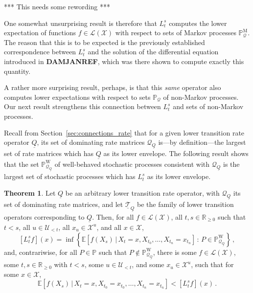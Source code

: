 \documentclass[10pt]{paper}
\theoremstyle{definition}
\newtheorem{theorem}{Theorem}
\newcommand{\reals}{\mathbb{R}}
\newcommand{\realsnonneg}{\reals_{\geq 0}}
\newcommand{\states}{\mathcal{X}}
\newcommand{\processes}{\mathbb{P}}
\newcommand{\mprocesses}{\processes^{\mathrm{M}}}
\newcommand{\wprocesses}{\processes^{\mathrm{W}}}
\newcommand{\gambles}{\mathcal{L}}
\newcommand{\gamblesX}{\gambles(\states)}
\newcommand{\rateset}{\mathcal{Q}}
\newcommand{\lrate}{\underline{Q}}
\begin{document}
*** This needs some rewording ***

One somewhat unsurprising result is therefore that $L_t^s$ computes the lower expectation of functions $f\in\gamblesX$ with respect to sets of Markov processes $\mprocesses_\rateset$. The reason that this is to be expected is the previously established correspondence between $L_t^s$ and the solution of the differential equation introduced in {\bf DAMJANREF}, which was there shown to compute exactly this quantity.

A rather more surprising result, perhaps, is that this \emph{same} operator also computes lower expectations with respect to sets $\processes_\rateset$ of non-Markov processes. Our next result strengthens this connection between $L_t^s$ and sets of non-Markov processes.

Recall from Section~\ref{sec:connections_rate} that for a given lower transition rate operator $\lrate$, its set of dominating rate matrices $\rateset_{\lrate}$ is---by definition---the largest set of rate matrices which has $\lrate$ as its lower envelope. The following result shows that the set $\wprocesses_{\rateset_{\lrate}}$ of well-behaved stochastic processes consistent with $\rateset_{\lrate}$ is the largest set of stochastic processes which has $L_t^s$ as its lower envelope.

\begin{theorem}\label{theo:dominating_rate_processes_max_set}
Let $\lrate$ be an arbitrary lower transition rate operator, with $\rateset_{\lrate}$ its set of dominating rate matrices, and let  $\underline{\mathcal{T}}_{\lrate}$ be the family of lower transition operators corresponding to $\lrate$. Then, for all $f\in\gamblesX$, all $t,s\in\realsnonneg$ such that $t<s$, all $u\in\mathcal{U}_{<t}$, all $x_u\in\states^u$, and all $x\in\states$,
\begin{equation*}
\left[L_t^sf\right](x) = \inf\left\{\mathbb{E}[f(X_s)\,\vert\,X_t=x,X_{t_0},\ldots,X_{t_n}=x_{t_n}]\,:\,P\in\wprocesses_{\rateset_{\lrate}}\right\}\,,
\end{equation*}
and, contrariwise, for all $P\in\processes$ such that $P\notin\wprocesses_{\rateset_{\lrate}}$, there is some $f\in\gamblesX$, some $t,s\in\realsnonneg$ with $t<s$, some $u\in\mathcal{U}_{<t}$, and some $x_u\in\states^u$, such that for some $x\in\states$,
\begin{equation*}
\mathbb{E}\left[f(X_s)\,\vert\,X_t=x,X_{t_0}=x_{t_0},\ldots,X_{t_n}=x_{t_n}\right] < \left[L_t^sf\right](x)\,.
\end{equation*}
\end{theorem}
\end{document}
